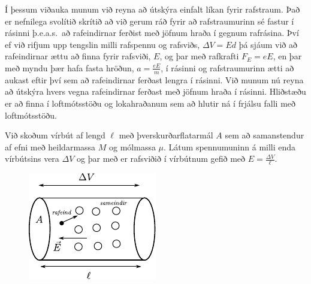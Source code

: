 Í þessum viðauka munum við reyna að útskýra einfalt líkan fyrir rafstraum. Það er nefnilega svolítið skrítið að við gerum ráð fyrir að rafstraumurinn sé fastur í rásinni þ.e.a.s.~að rafeindirnar ferðist með jöfnum hraða í gegnum rafrásina. Því ef við rifjum upp tengslin milli rafspennu og rafsviðs, $\Delta V = Ed$ þá sjáum við að rafeindirnar ættu að finna fyrir rafsviði, $E$, og þar með rafkrafti $F_E = eE$, en þar með myndu þær hafa fasta hröðun, $a = \frac{eE}{m}$, í rásinni og rafstraumurinn ætti að aukast eftir því sem að rafeindirnar ferðast lengra í rásinni. Við munum nú reyna að útskýra hvers vegna rafeindirnar ferðast með jöfnum hraða í rásinni. Hliðstæðu er að finna í loftmótsstöðu og lokahraðanum sem að hlutir ná í frjálsu falli með loftmótsstöðu. \\

\vspace{0.2cm}


Við skoðum vírbút af lengd $\ell$ með þverskurðarflatarmál $A$ sem að samanstendur af efni með heildarmassa $M$ og mólmassa $\mu$. Látum spennumuninn á milli enda vírbútsins vera $\Delta V$ og þar með er rafsviðið í vírbútnum gefið með $E = \frac{\Delta V}{\ell}$. 

\begin{figure}[H]
    \centering
    \includegraphics[scale = 1.4]{figures/drude1.pdf}
\end{figure}

